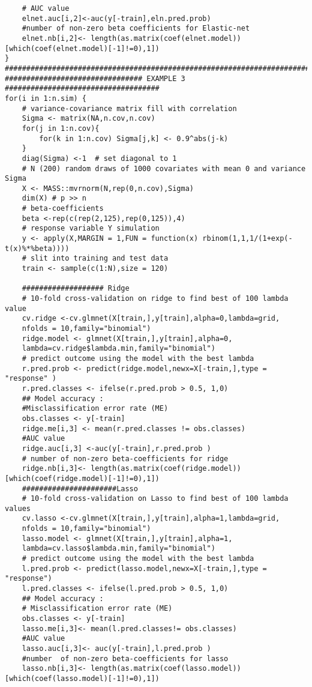 \documentclass[12pt]{report}
\begin{document}
\begin{lstlisting}
	# AUC value
	elnet.auc[i,2]<-auc(y[-train],eln.pred.prob)
	#number of non-zero beta coefficients for Elastic-net
	elnet.nb[i,2]<- length(as.matrix(coef(elnet.model))[which(coef(elnet.model)[-1]!=0),1])	
}
###############################################################################
################################ EXAMPLE 3 ####################################
for(i in 1:n.sim) {
	# variance-covariance matrix fill with correlation
	Sigma <- matrix(NA,n.cov,n.cov) 
	for(j in 1:n.cov){
		for(k in 1:n.cov) Sigma[j,k] <- 0.9^abs(j-k)
	}
	diag(Sigma) <-1  # set diagonal to 1
	# N (200) random draws of 1000 covariates with mean 0 and variance Sigma
	X <- MASS::mvrnorm(N,rep(0,n.cov),Sigma)
	dim(X) # p >> n 
	# beta-coefficients
	beta <-rep(c(rep(2,125),rep(0,125)),4)
	# response variable Y simulation
	y <- apply(X,MARGIN = 1,FUN = function(x) rbinom(1,1,1/(1+exp(-t(x)%*%beta))))
	# slit into training and test data
	train <- sample(c(1:N),size = 120)
	
	################### Ridge
	# 10-fold cross-validation on ridge to find best of 100 lambda value
	cv.ridge <-cv.glmnet(X[train,],y[train],alpha=0,lambda=grid,
	nfolds = 10,family="binomial")
	ridge.model <- glmnet(X[train,],y[train],alpha=0,
	lambda=cv.ridge$lambda.min,family="binomial")
	# predict outcome using the model with the best lambda
	r.pred.prob <- predict(ridge.model,newx=X[-train,],type = "response" )
	r.pred.classes <- ifelse(r.pred.prob > 0.5, 1,0)
	## Model accuracy :
	#Misclassification error rate (ME)
	obs.classes <- y[-train]
	ridge.me[i,3] <- mean(r.pred.classes != obs.classes)
	#AUC value
	ridge.auc[i,3] <-auc(y[-train],r.pred.prob )
	# number of non-zero beta-coefficients for ridge
	ridge.nb[i,3]<- length(as.matrix(coef(ridge.model))[which(coef(ridge.model)[-1]!=0),1])
	######################Lasso
	# 10-fold cross-validation on Lasso to find best of 100 lambda values
	cv.lasso <-cv.glmnet(X[train,],y[train],alpha=1,lambda=grid,
	nfolds = 10,family="binomial")
	lasso.model <- glmnet(X[train,],y[train],alpha=1,
	lambda=cv.lasso$lambda.min,family="binomial")
	# predict outcome using the model with the best lambda
	l.pred.prob <- predict(lasso.model,newx=X[-train,],type = "response")
	l.pred.classes <- ifelse(l.pred.prob > 0.5, 1,0)
	## Model accuracy :
	# Misclassification error rate (ME)
	obs.classes <- y[-train]
	lasso.me[i,3]<- mean(l.pred.classes!= obs.classes)
	#AUC value
	lasso.auc[i,3]<- auc(y[-train],l.pred.prob )
	#number  of non-zero beta-coefficients for lasso
	lasso.nb[i,3]<- length(as.matrix(coef(lasso.model))[which(coef(lasso.model)[-1]!=0),1])
	

\end{lstlisting}
\end{document}
